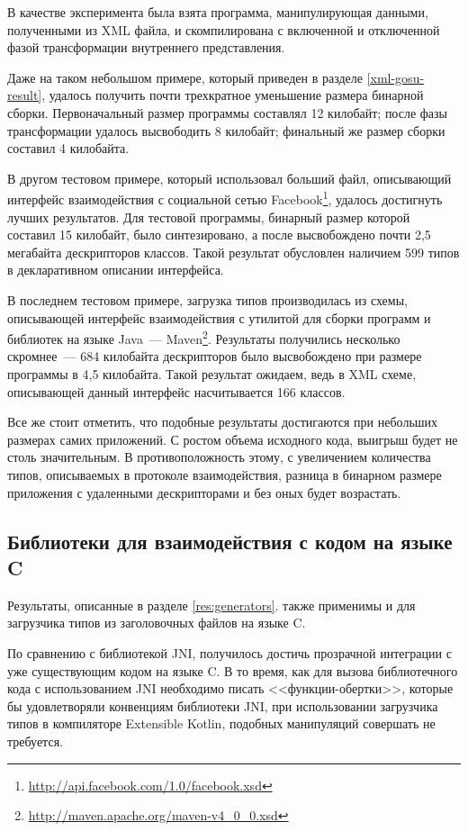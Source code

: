 В качестве эксперимента была взята программа, манипулирующая данными, полученными из XML файла, и скомпилирована с включенной и отключенной фазой трансформации внутреннего представления.

Даже на таком небольшом примере, который приведен в разделе \ref{xml-gosu-result}, удалось получить почти трехкратное уменьшение размера бинарной сборки.
Первоначальный размер программы составлял 12 килобайт; после фазы трансформации удалось высвободить 8 килобайт; финальный же размер сборки составил 4 килобайта.

В другом тестовом примере, который использовал больший файл, описывающий интерфейс взаимодействия с социальной сетью Facebook\footnote{\url{http://api.facebook.com/1.0/facebook.xsd}}, удалось достигнуть лучших результатов.
Для тестовой программы, бинарный размер которой составил 15 килобайт, было синтезировано, а после высвобождено почти 2,5 мегабайта дескрипторов классов. Такой результат обусловлен наличием 599 типов в декларативном описании интерфейса.

В последнем тестовом примере, загрузка типов производилась из схемы, описывающей интерфейс взаимодействия с утилитой для сборки программ и библиотек на языке Java~--- Maven\footnote{\url{http://maven.apache.org/maven-v4_0_0.xsd}}.
Результаты получились несколько скромнее~--- 684 килобайта дескрипторов было высвобождено при размере программы в 4,5 килобайта. Такой результат ожидаем, ведь в XML схеме, описывающей данный интерфейс насчитывается 166 классов.

Все же стоит отметить, что подобные результаты достигаются при небольших размерах самих приложений.
С ростом объема исходного кода, выигрыш будет не столь значительным. В противоположность этому, с увеличением количества типов, описываемых в протоколе взаимодействия, разница в бинарном размере приложения с удаленными дескрипторами и без оных будет возрастать.

\subsection{Библиотеки для взаимодействия с кодом на языке C}
Результаты, описанные в разделе \ref{res:generators}. также применимы и для загрузчика типов из заголовочных файлов на языке C.

По сравнению с библиотекой JNI, получилось достичь прозрачной интеграции с уже существующим кодом на языке C.
В то время, как для вызова библиотечного кода с использованием JNI необходимо писать <<функции-обертки>>, которые бы удовлетворяли конвенциям библиотеки JNI, при использовании загрузчика типов в компиляторе Extensible Kotlin, подобных манипуляций совершать не требуется.

